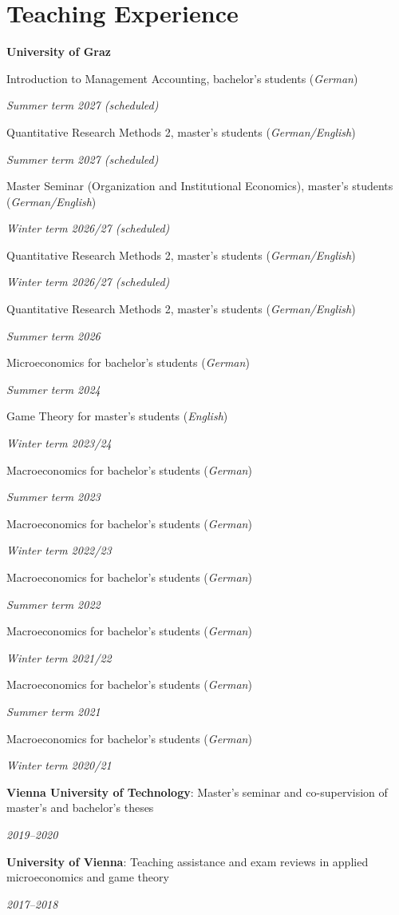 \documentclass[11pt,letterpaper]{article}
\newcommand{\entry}[2]{%
  \par\noindent
  \begin{minipage}[t]{0.73\textwidth}
    \raggedright #1
  \end{minipage}%
  \hfill
  \begin{minipage}[t]{0.24\textwidth}
    \raggedleft\itshape #2
  \end{minipage}%
  \par
}
\newcommand{\cvsection}[1]{%
  \Needspace{6\baselineskip}%
  \section*{#1}%
}
\begin{document}
\cvsection{Teaching Experience}
\textbf{University of Graz}

\entry{Introduction to Management Accounting, bachelor's students (\textit{German})}{Summer term 2027 (scheduled)}
\entry{Quantitative Research Methods 2, master's students (\textit{German/English})}{Summer term 2027 (scheduled)}
\entry{Master Seminar (Organization and Institutional Economics), master's students (\textit{German/English})}{Winter term 2026/27 (scheduled)}
\entry{Quantitative Research Methods 2, master's students (\textit{German/English})}{Winter term 2026/27 (scheduled)}
\entry{Quantitative Research Methods 2, master's students (\textit{German/English})}{Summer term 2026}
\entry{Microeconomics for bachelor's students (\textit{German})}{Summer term 2024}
\entry{Game Theory for master's students (\textit{English})}{Winter term 2023/24}
\entry{Macroeconomics for bachelor's students (\textit{German})}{Summer term 2023}
\entry{Macroeconomics for bachelor's students (\textit{German})}{Winter term 2022/23}
\entry{Macroeconomics for bachelor's students (\textit{German})}{Summer term 2022}
\entry{Macroeconomics for bachelor's students (\textit{German})}{Winter term 2021/22}
\entry{Macroeconomics for bachelor's students (\textit{German})}{Summer term 2021}
\entry{Macroeconomics for bachelor's students (\textit{German})}{Winter term 2020/21}

\medskip
\entry{\textbf{Vienna University of Technology}: Master's seminar and co-supervision of master's and bachelor's theses}{2019--2020}

\medskip
\entry{\textbf{University of Vienna}: Teaching assistance and exam reviews in applied microeconomics and game theory}{2017--2018}
\end{document}
